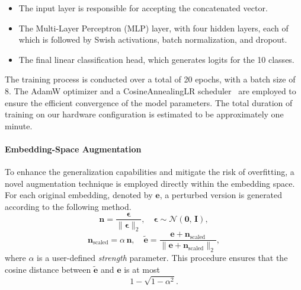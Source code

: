 \begin{itemize}
    \item The input layer is responsible for accepting the concatenated vector.
    \item The Multi-Layer Perceptron (MLP) layer, with four hidden layers, each of which is followed by Swish activations, batch normalization, and dropout.
    \item The final linear classification head, which generates logits for the 10 classes.
\end{itemize}


The training process is conducted over a total of 20 epochs, with a batch size of 8.
The AdamW optimizer and a CosineAnnealingLR scheduler~\cite{loshchilov2016sgdr} are employed to ensure the efficient convergence of the model parameters.
The total duration of training on our hardware configuration is estimated to be approximately one minute.


\paragraph{Embedding-Space Augmentation} To enhance the generalization capabilities and mitigate the risk of overfitting, a novel augmentation technique is employed directly within the embedding space.
For each original embedding, denoted by $\mathbf{e}$, a perturbed version is generated according to the following method.
\[
\mathbf{n} = \frac{\boldsymbol{\epsilon}}{\|\boldsymbol{\epsilon}\|_2}, \quad
\boldsymbol{\epsilon} \sim \mathcal{N}(\mathbf{0},\,\mathbf{I}),
\]
\[
\mathbf{n}_{\text{scaled}} = \alpha \,\mathbf{n},\quad
\widetilde{\mathbf{e}} = \frac{\mathbf{e} + \mathbf{n}_{\text{scaled}}}{\|\mathbf{e} + \mathbf{n}_{\text{scaled}}\|_2},
\]
where \(\alpha\) is a user-defined \emph{strength} parameter. This procedure ensures that the cosine distance between \(\widetilde{\mathbf{e}}\) and \(\mathbf{e}\) is at most 
\[
1 - \sqrt{1 - \alpha^2}.
\]


